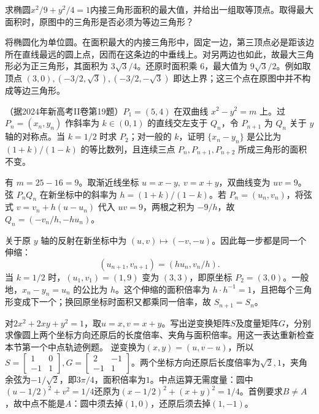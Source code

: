 求椭圆\(x^2/9+y^2/4=1\)内接三角形面积的最大值，并给出一组取等顶点。取得最大面积时，原图中的三角形是否必须为等边三角形？
\par
\solutionanswer
将椭圆化为单位圆。在面积最大的内接三角形中，固定一边，第三顶点必是距该边所在直线最远的圆上点，因而在这条边的中垂线上。对另两边也如此，故最大三角形必为正三角形，其面积为 \(3\sqrt3/4\)。还原时面积乘 \(6\)，最大值为 \(9\sqrt3/2\)。例如取顶点 \((3,0),(-3/2,\sqrt3),(-3/2,-\sqrt3)\) 即达上界；这三个点在原图中并不构成等边三角形。


（据2024年新高考II卷第19题）\(P_1=(5,4)\) 在双曲线 \(x^2-y^2=m\) 上。过 \(P_n=(x_n,y_n)\) 作斜率为 \(k\in(0,1)\) 的直线交左支于 \(Q_n\)，令 \(P_{n+1}\) 为 \(Q_n\) 关于 \(y\) 轴的对称点。当 \(k=1/2\) 时求 \(P_2\)；对一般的 \(k\)，证明 \(\{x_n-y_n\}\) 是公比为 \((1+k)/(1-k)\) 的等比数列，且连续三点 \(P_n,P_{n+1},P_{n+2}\) 所成三角形的面积不变。
\par
\solutionanswer
有 \(m=25-16=9\)。取渐近线坐标 \(u=x-y,\ v=x+y\)，双曲线变为 \(uv=9\)。弦 \(P_nQ_n\) 在新坐标中的斜率为 \(h=(1+k)/(1-k)\)。若 \(P_n=(u_n,v_n)\)，将弦式 \(v=v_n+h(u-u_n)\) 代入 \(uv=9\)，两根之积为 \(-9/h\)，故 \(Q_n=(-v_n/h,-hu_n)\)。

关于原 \(y\) 轴的反射在新坐标中为 \((u,v)\mapsto(-v,-u)\)。因此每一步都是同一个伸缩：
\[
    (u_{n+1},v_{n+1})=(hu_n,v_n/h).
\]
当 \(k=1/2\) 时，\((u_1,v_1)=(1,9)\) 变为 \((3,3)\)，即原坐标 \(P_2=(3,0)\)。一般地，\(x_n-y_n=u_n\) 的公比为 \(h\)。这个伸缩的面积倍率为 \(h\cdot h^{-1}=1\)，且把每个三角形变成下一个；换回原坐标时面积又都乘同一倍率，故 \(S_{n+1}=S_n\)。


对\(2x^2+2xy+y^2=1\)，取\(u=x,v=x+y\)。写出逆变换矩阵\(S\)及度量矩阵\(G\)，分别求像圆上两个坐标方向还原后的长度倍率、夹角与面积倍率。用这一表达重新检查本节第一个中点轨迹例题。
\solutionanswer
逆变换为\((x,y)=(u,v-u)\)，所以\(S=\begin{bmatrix}1&0\\-1&1\end{bmatrix},G=\begin{bmatrix}2&-1\\-1&1\end{bmatrix}\)。两个坐标方向还原后长度倍率为\(\sqrt2,1\)，夹角余弦为\(-1/\sqrt2\)，即\(3\pi/4\)，面积倍率为\(1\)。中点运算无需度量：圆中\((u-1/2)^2+v^2=1/4\)还原为\((x-1/2)^2+(x+y)^2=1/4\)。首例要求\(B\ne A\)，故中点不能是\(A\)：圆中须去掉\((1,0)\)，还原后须去掉\((1,-1)\)。


